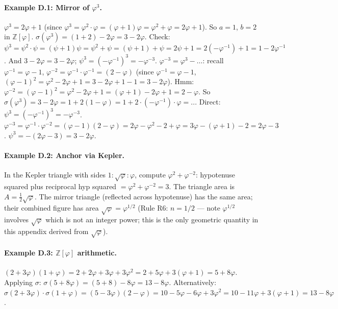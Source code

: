 \paragraph{Example D.1: Mirror of $\varphi^3$.}
$\varphi^3 = 2\varphi+1$ (since $\varphi^3 = \varphi^2\cdot\varphi = (\varphi+1)\varphi = \varphi^2+\varphi = 2\varphi+1$).
So $a=1$, $b=2$ in $\mathbb{Z}[\varphi]$.
$\sigma(\varphi^3) = (1+2)-2\varphi = 3-2\varphi$.
Check: $\psi^3 = \psi^2\cdot\psi = (\psi+1)\psi = \psi^2+\psi = (\psi+1)+\psi = 2\psi+1
= 2(-\varphi^{-1})+1 = 1-2\varphi^{-1}$.
And $3-2\varphi = 3-2\varphi$; $\psi^3 = (-\varphi^{-1})^3 = -\varphi^{-3}$.
$\varphi^{-3} = \varphi^3 - \ldots$: recall $\varphi^{-1}=\varphi-1$,
$\varphi^{-2}=\varphi^{-1}\cdot\varphi^{-1}=(2-\varphi)$ (since $\varphi^{-1}=\varphi-1$,
$(\varphi-1)^2=\varphi^2-2\varphi+1=3-2\varphi+1-1=3-2\varphi$).
Hmm: $\varphi^{-2}=(\varphi-1)^2 = \varphi^2-2\varphi+1 = (\varphi+1)-2\varphi+1 = 2-\varphi$.
So $\sigma(\varphi^3) = 3-2\varphi = 1+2(1-\varphi) = 1 + 2\cdot(-\varphi^{-1})\cdot\varphi = ...$
Direct: $\psi^3 = (-\varphi^{-1})^3 = -\varphi^{-3}$.
$\varphi^{-3} = \varphi^{-1}\cdot\varphi^{-2} = (\varphi-1)(2-\varphi) = 2\varphi-\varphi^2-2+\varphi
= 3\varphi-(\varphi+1)-2 = 2\varphi-3$.
$\psi^3 = -(2\varphi-3) = 3-2\varphi$. \checkmark

\paragraph{Example D.2: Anchor via Kepler.}
In the Kepler triangle with sides $1:\sqrt\varphi:\varphi$, compute
$\varphi^2+\varphi^{-2}$: hypotenuse squared plus reciprocal hyp squared
$= \varphi^2 + \varphi^{-2} = 3$. The triangle area is
$A = \frac{1}{2}\sqrt\varphi$.
The mirror triangle (reflected across hypotenuse) has the same area;
their combined figure has area $\sqrt\varphi = \varphi^{1/2}$ (Rule R6: $n=1/2$ — note
$\varphi^{1/2}$ involves $\sqrt\varphi$ which is not an integer power;
this is the only geometric quantity in this appendix derived from $\sqrt\varphi$).

\paragraph{Example D.3: $\mathbb{Z}[\varphi]$ arithmetic.}
$(2+3\varphi)(1+\varphi) = 2+2\varphi+3\varphi+3\varphi^2 = 2+5\varphi+3(\varphi+1) = 5+8\varphi$.
Applying $\sigma$: $\sigma(5+8\varphi) = (5+8)-8\varphi = 13-8\varphi$.
Alternatively: $\sigma(2+3\varphi)\cdot\sigma(1+\varphi) = (5-3\varphi)(2-\varphi) = 10-5\varphi-6\varphi+3\varphi^2
= 10-11\varphi+3(\varphi+1) = 13-8\varphi$. \checkmark

